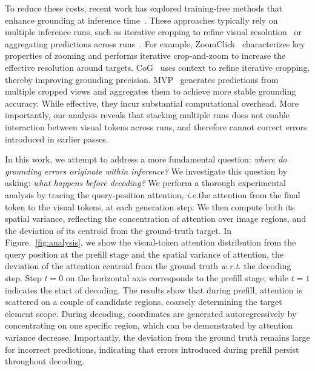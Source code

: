 \documentclass{article}
\def\ie{\emph{i.e.}}
\def\wrt{\emph{w.r.t. }}
\begin{document}
To reduce these costs, recent work has explored training-free methods that enhance grounding at inference time~\cite{reguide, regionfocus}.
These approaches typically rely on multiple inference runs, such as iterative cropping to refine visual resolution~\citep{regionfocus, zoomclick, chainofground} or aggregating predictions across runs~\citep{uizoomer, mvp, dimogui}. For example, ZoomClick~\citep{zoomclick} characterizes key properties of zooming and performs iterative crop-and-zoom to increase the effective resolution around targets. CoG~\citep{chainofground} uses context to refine iterative cropping, thereby improving grounding precision. MVP~\citep{mvp} generates predictions from multiple cropped views and aggregates them to achieve more stable grounding accuracy.
While effective, they incur substantial computational overhead.
More importantly, our analysis reveals that stacking multiple runs does not enable interaction between visual tokens across runs, and therefore cannot correct errors introduced in earlier passes.

In this work, we attempt to address a more fundamental question: \emph{where do grounding errors originate within inference?} We investigate this question by asking: \emph{what happens before decoding?} We perform a thorough experimental analysis by tracing the query-position attention, \ie the attention from the final token to the visual tokens, at each generation step. We then compute both its spatial variance, reflecting the concentration of attention over image regions, and the deviation of its centroid from the ground-truth target. 
In Figure.~\ref{fig:analysis}, we show the visual-token attention distribution from the query position at the prefill stage and the spatial variance of attention, the deviation of the attention centroid from the ground truth \wrt the decoding step.
Step $t=0$ on the horizontal axis corresponds to the prefill stage, while $t=1$ indicates the start of decoding.
The results show that during prefill, attention is scattered on a couple of candidate regions, coarsely determining the target element scope.
During decoding, coordinates are generated autoregressively by concentrating on one specific region, which can be demonstrated by attention variance decrease.
Importantly, the deviation from the ground truth remains large for incorrect predictions, indicating that errors introduced during prefill persist throughout decoding.
\end{document}
